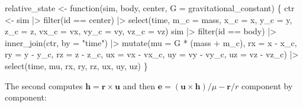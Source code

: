 \documentclass[
  10.5pt,
  letterpaper,
]{scrbook}
\newenvironment{Shaded}{\begin{snugshade}}{\end{snugshade}}
\newcommand{\AttributeTok}[1]{\textcolor[rgb]{0.00,0.00,0.00}{#1}}
\newcommand{\ControlFlowTok}[1]{\textcolor[rgb]{0.00,0.00,0.00}{#1}}
\newcommand{\FunctionTok}[1]{\textcolor[rgb]{0.00,0.00,0.00}{#1}}
\newcommand{\NormalTok}[1]{\textcolor[rgb]{0.00,0.00,0.00}{#1}}
\newcommand{\OtherTok}[1]{\textcolor[rgb]{0.00,0.00,0.00}{#1}}
\newcommand{\SpecialCharTok}[1]{\textcolor[rgb]{0.00,0.00,0.00}{#1}}
\newcommand{\StringTok}[1]{\textcolor[rgb]{0.00,0.00,0.00}{#1}}
\theoremstyle{plain}
\theoremstyle{remark}
\begin{document}
\begin{Shaded}
\begin{Highlighting}[]
\NormalTok{relative\_state }\OtherTok{\textless{}{-}} \ControlFlowTok{function}\NormalTok{(sim, body, center, }\AttributeTok{G =}\NormalTok{ gravitational\_constant) \{}
\NormalTok{  ctr }\OtherTok{\textless{}{-}}\NormalTok{ sim }\SpecialCharTok{|\textgreater{}}
    \FunctionTok{filter}\NormalTok{(id }\SpecialCharTok{==}\NormalTok{ center) }\SpecialCharTok{|\textgreater{}}
    \FunctionTok{select}\NormalTok{(time, }\AttributeTok{m\_c =}\NormalTok{ mass, }\AttributeTok{x\_c =}\NormalTok{ x, }\AttributeTok{y\_c =}\NormalTok{ y, }\AttributeTok{z\_c =}\NormalTok{ z,}
           \AttributeTok{vx\_c =}\NormalTok{ vx, }\AttributeTok{vy\_c =}\NormalTok{ vy, }\AttributeTok{vz\_c =}\NormalTok{ vz)}
\NormalTok{  sim }\SpecialCharTok{|\textgreater{}}
    \FunctionTok{filter}\NormalTok{(id }\SpecialCharTok{==}\NormalTok{ body) }\SpecialCharTok{|\textgreater{}}
    \FunctionTok{inner\_join}\NormalTok{(ctr, }\AttributeTok{by =} \StringTok{"time"}\NormalTok{) }\SpecialCharTok{|\textgreater{}}
    \FunctionTok{mutate}\NormalTok{(}\AttributeTok{mu =}\NormalTok{ G }\SpecialCharTok{*}\NormalTok{ (mass }\SpecialCharTok{+}\NormalTok{ m\_c),}
           \AttributeTok{rx =}\NormalTok{ x }\SpecialCharTok{{-}}\NormalTok{ x\_c,   }\AttributeTok{ry =}\NormalTok{ y }\SpecialCharTok{{-}}\NormalTok{ y\_c,   }\AttributeTok{rz =}\NormalTok{ z }\SpecialCharTok{{-}}\NormalTok{ z\_c,}
           \AttributeTok{ux =}\NormalTok{ vx }\SpecialCharTok{{-}}\NormalTok{ vx\_c, }\AttributeTok{uy =}\NormalTok{ vy }\SpecialCharTok{{-}}\NormalTok{ vy\_c, }\AttributeTok{uz =}\NormalTok{ vz }\SpecialCharTok{{-}}\NormalTok{ vz\_c) }\SpecialCharTok{|\textgreater{}}
    \FunctionTok{select}\NormalTok{(time, mu, rx, ry, rz, ux, uy, uz)}
\NormalTok{\}}
\end{Highlighting}
\end{Shaded}

The second computes \(\mathbf{h} = \mathbf{r}\times\mathbf{u}\) and then
\(\mathbf{e} = (\mathbf{u}\times\mathbf{h})/\mu - \mathbf{r}/r\)
component by component:
\end{document}
